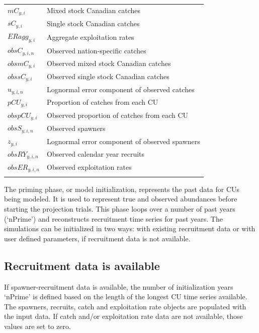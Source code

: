 \documentclass[11pt]{book}
\begin{document}
\begin{longtable}[]{l p{13.5cm}}
${mC}_{y,i}$ & Mixed stock Canadian catches \\
${sC}_{y,i}$ & Single stock Canadian catches\\
$ERagg_{y,i}$ & Aggregate exploitation rates\\
${obsC}_{y,i,n}$ & Observed nation-specific catches \\
${obsmC}_{y,i}$ & Observed mixed stock Canadian catches\\
${obssC}_{y,i}$ & Observed single stock Canadian catches\\
$u_{y,i,n}$ & Lognormal error component of observed catches\\
$pCU_{y,i}$ & Proportion of catches from each CU\\
$obspCU_{y,i}$ & Observed proportion of catches from each CU \\
${obsS}_{y,i,n}$ & Observed spawners \\
$z_{y,i}$ & Lognormal error component of observed spawners\\
${obsRY}_{y,i,n}$ & Observed calendar year recruits \\
${obsER}_{y,i,n}$ & Observed exploitation rates \\
\hline
\label{tab:modtab}
\end{longtable}
\hypertarget{model-priming}{%
\label{model-priming}}

The priming phase, or model initialization, represents the past data for CUs being modeled. It is used to represent true and observed abundances before starting the projection trials. This phase loops over a number of past years (`nPrime') and reconstructs recruitment time series for past years. The simulations can be initialized in two ways: with existing recruitment data or with user defined parameters, if recruitment data is not available.

\hypertarget{recruitment-data-is-available}{%
\subsection{Recruitment data is available}\label{recruitment-data-is-available}}

If spawner-recruitment data is available, the number of initialization years `nPrime' is defined based on the length of the longest CU time series available. The spawners, recruits, catch and exploitation rate objects are populated with the input data. If catch and/or exploitation rate data are not available, those values are set to zero.
\end{document}
